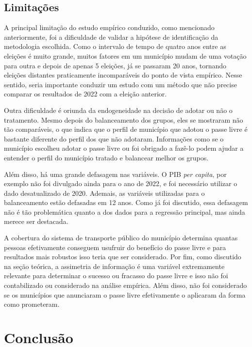 \subsection{Limitações}

A principal limitação do estudo empírico conduzido, como mencionado anteriormente, foi a dificuldade de validar a hipótese de identificação da metodologia escolhida. Como o intervalo de tempo de quatro anos entre as eleições é muito grande, muitos fatores em um município mudam de uma votação para outra e depois de apenas 5 eleições, já se passaram 20 anos, tornando eleições distantes praticamente incomparáveis do ponto de vista empírico. Nesse sentido, seria importante conduzir um estudo com um método que não precise comparar os resultados de 2022 com a eleição anterior.

Outra dificuldade é oriunda da endogeneidade na decisão de adotar ou não o tratamento. Mesmo depois do balanceamento dos grupos, eles se mostraram não tão comparáveis, o que indica que o perfil de município que adotou o passe livre é bastante diferente do perfil dos que não adotaram. Informações como se o município escolheu adotar o passe livre ou foi obrigado a fazê-lo podem ajudar a entender o perfil do município tratado e balancear melhor os grupos.

Além disso, há uma grande defasagem nas variáveis. O PIB \textit{per capita}, por exemplo não foi divulgado ainda para o ano de 2022, e foi necessário utilizar o dado desatualizado de 2020. Ademais, as variáveis utilizadas para o balanceamento estão defasadas em 12 anos. Como já foi discutido, essa defasagem não é tão problemática quanto a dos dados para a regressão principal, mas ainda merece ser destacada.

A cobertura do sistema de transporte público do município determina quantas pessoas efetivamente conseguem usufruir do benefício do passe livre e para resultados mais robustos isso teria que ser considerado. Por fim, como discutido na seção teórica, a assimetria de informação é uma variável extremamente relevante para determinar o sucesso ou fracasso do passe livre e isso não foi contabilizado ou considerado na análise empírica. Além disso, não foi considerado se os municípios que anunciaram o passe livre efetivamente o aplicaram da forma como prometeram.

\section{Conclusão}

